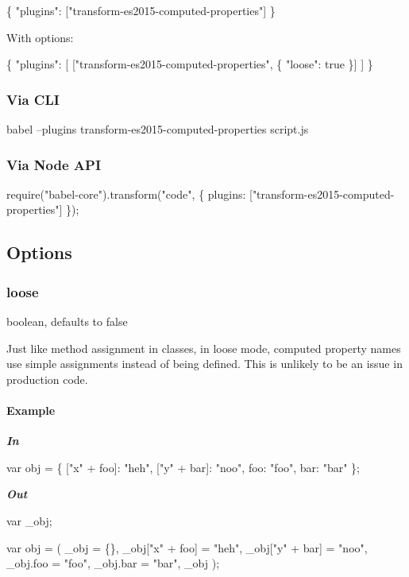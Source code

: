 \begin{DoxyCode}
\{
  "plugins": ["transform-es2015-computed-properties"]
\}
\end{DoxyCode}


With options\+:


\begin{DoxyCode}
\{
  "plugins": [
    ["transform-es2015-computed-properties", \{
      "loose": true
    \}]
  ]
\}
\end{DoxyCode}


\subsubsection*{Via C\+LI}


\begin{DoxyCode}
babel --plugins transform-es2015-computed-properties script.js
\end{DoxyCode}


\subsubsection*{Via Node A\+PI}


\begin{DoxyCode}
require("babel-core").transform("code", \{
  plugins: ["transform-es2015-computed-properties"]
\});
\end{DoxyCode}


\subsection*{Options}

\subsubsection*{{\ttfamily loose}}

{\ttfamily boolean}, defaults to {\ttfamily false}

Just like method assignment in classes, in loose mode, computed property names use simple assignments instead of being defined. This is unlikely to be an issue in production code.

\paragraph*{Example}

{\itshape {\bfseries In}}


\begin{DoxyCode}
var obj = \{
  ["x" + foo]: "heh",
  ["y" + bar]: "noo",
  foo: "foo",
  bar: "bar"
\};
\end{DoxyCode}


{\itshape {\bfseries Out}}


\begin{DoxyCode}
var \_obj;

var obj = (
  \_obj = \{\},
  \_obj["x" + foo] = "heh",
  \_obj["y" + bar] = "noo",
  \_obj.foo = "foo",
  \_obj.bar = "bar",
  \_obj
);
\end{DoxyCode}
 